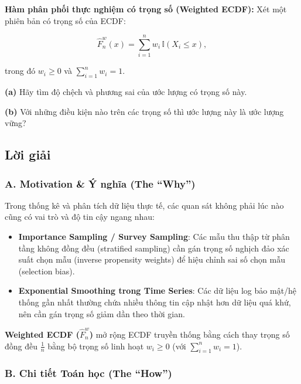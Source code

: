 \documentclass[12pt,a4paper]{article}
\begin{document}
\begin{debai}

\textbf{Hàm phân phối thực nghiệm có trọng số (Weighted ECDF):} Xét một phiên bản có trọng số của ECDF:

\[\widehat{F}_n^w(x) = \sum_{i=1}^n w_i \, \mathbb{I}(X_i \le x),\]

trong đó \(w_i \ge 0\) và \(\sum_{i=1}^n w_i = 1\).

\textbf{(a)} Hãy tìm độ chệch và phương sai của ước lượng có trọng số này.

\textbf{(b)} Với những điều kiện nào trên các trọng số thì ước lượng này là ước lượng vững?

\end{debai}
\subsection*{Lời giải}

\subsubsection{A. Motivation \& Ý nghĩa (The ``Why'')}\label{a.-motivation-uxfd-nghux129a-the-why-7}

Trong thống kê và phân tích dữ liệu thực tế, các quan sát không phải lúc nào cũng có vai trò và độ tin cậy ngang nhau:

\begin{itemize}

\item
  \textbf{Importance Sampling / Survey Sampling}: Các mẫu thu thập từ phân tầng không đồng đều (stratified sampling) cần gán trọng số nghịch đảo xác suất chọn mẫu (inverse propensity weights) để hiệu chỉnh sai số chọn mẫu (selection bias).
\item
  \textbf{Exponential Smoothing trong Time Series}: Các dữ liệu log bảo mật/hệ thống gần nhất thường chứa nhiều thông tin cập nhật hơn dữ liệu quá khứ, nên cần gán trọng số giảm dần theo thời gian.
\end{itemize}

\textbf{Weighted ECDF (\(\widehat{F}_n^w\))} mở rộng ECDF truyền thống bằng cách thay trọng số đồng đều \(\frac{1}{n}\) bằng bộ trọng số linh hoạt \(w_i \ge 0\) (với \(\sum_{i=1}^n w_i = 1\)).

\subsubsection{B. Chi tiết Toán học (The ``How'')}\label{b.-chi-tiux1ebft-touxe1n-hux1ecdc-the-how-7}
\end{document}
